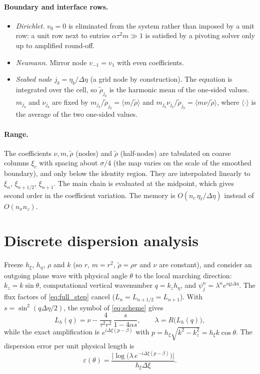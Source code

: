 \documentclass[11pt,a4paper]{article}
\theoremstyle{remark}
\newcommand{\rt}{\tilde\rho}
\newcommand{\het}{\nu}
\newcommand{\etab}{\eta_{b}}
\newcommand{\etal}{\eta_{\ell}}
\begin{document}
\paragraph{Boundary and interface rows.}
\begin{itemize}
\item \emph{Dirichlet.} $v_0=0$ is eliminated from the system rather than
imposed by a unit row: a unit row next to entries $\alpha\tau^2m\gg1$ is
satisfied by a pivoting solver only up to amplified round-off.
\item \emph{Neumann.} Mirror node $v_{-1}=v_1$ with even coefficients.
\item \emph{Seabed node} $j_b=\etab/\Delta\eta$ (a grid node by construction).
The equation is integrated over the cell, so $\rt_{j_b}$ is the harmonic mean of
the one-sided values. $m_{j_b}$ and $\het_{j_b}$ are fixed by
$m_{j_b}/\rt_{j_b}=\langle m/\rt\rangle$ and
$m_{j_b}\het_{j_b}/\rt_{j_b}=\langle m\het/\rt\rangle$, where
$\langle\cdot\rangle$ is the average of the two one-sided values.
\end{itemize}

\paragraph{Range.} The coefficients $\het,m,\rt$ (nodes) and $\rt$ (half-nodes)
are tabulated on coarse columns $\xi_c$ with spacing about $\sigma/4$ (the map
varies on the scale of the smoothed boundary), and only below the identity
region. They are interpolated linearly to $\xi_n$, $\xi_{n+1/2}$, $\xi_{n+1}$.
The main chain is evaluated at the midpoint, which gives second order in the
coefficient variation. The memory is $O(n_c\,\etal/\Delta\eta)$ instead of
$O(n_x n_z)$.

\section{Discrete dispersion analysis}\label{sec:dispersion}

Freeze $h_\xi$, $h_\eta$, $\rho$ and $k$ (so $r$, $m=r^2$, $\rt=\rho r$ and $\het$
are constant), and consider an outgoing plane wave with physical angle $\theta$
to the local marching direction: $k_z=k\sin\theta$, computational vertical
wavenumber $q=k_zh_\eta$, and $\psi^n_j=\lambda^ne^{iqj\Delta\eta}$. The flux
factors of \eqref{eq:full_step} cancel ($L_n=L_{n+1/2}=L_{n+1}$). With
$s=\sin^2(q\Delta\eta/2)$, the symbol of \eqref{eq:scheme} gives
\begin{equation}\label{eq:Lh}
L_h(q)=\het-\frac{4}{\tau^2r^2}\,\frac{s}{1-4\alpha s},\qquad\lambda=R\bigl(L_h(q)\bigr),
\end{equation}
while the exact amplification is $e^{i\Delta\xi(p-\beta)}$ with
$p=h_\xi\sqrt{k^2-k_z^2}=h_\xi k\cos\theta$. The dispersion error per unit
physical length is
\begin{equation}\label{eq:disp_err}
\varepsilon(\theta)=\frac{\bigl|\log\bigl(\lambda\,e^{-i\Delta\xi(p-\beta)}\bigr)\bigr|}{h_\xi\Delta\xi}.
\end{equation}
\end{document}

